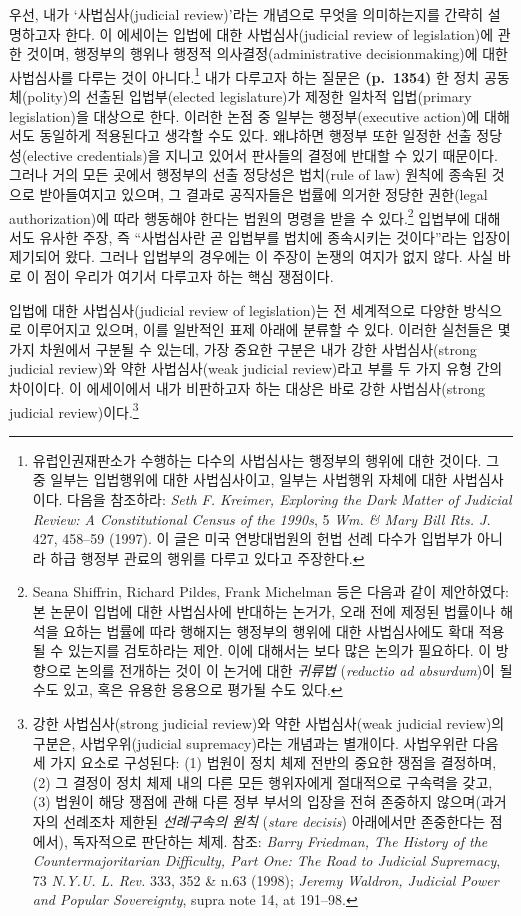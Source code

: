 \documentclass[a4paper,12pt,oneside]{article}  %
\newcommand{\emphksans}[1]{%
  {\kopubhangul\kopublatin\textsl{#1}}%
}
\begin{document}
우선, 내가 `사법심사(judicial review)'라는 개념으로 무엇을 의미하는지를
간략히 설명하고자 한다. 이 에세이는 입법에 대한 사법심사(judicial review
of legislation)에 관한 것이며, 행정부의 행위나 행정적
의사결정(administrative decisionmaking)에 대한 사법심사를 다루는 것이
아니다.\footnote{유럽인권재판소가 수행하는 다수의 사법심사는 행정부의
  행위에 대한 것이다. 그 중 일부는 입법행위에 대한 사법심사이고, 일부는
  사법행위 자체에 대한 사법심사이다. 다음을 참조하라: \emph{Seth F.
  Kreimer, Exploring the Dark Matter of Judicial Review: A
  Constitutional Census of the 1990s}, 5 \emph{Wm. \& Mary Bill Rts. J.}
  427, 458--59 (1997). 이 글은 미국 연방대법원의 헌법 선례 다수가
  입법부가 아니라 하급 행정부 관료의 행위를 다루고 있다고 주장한다.}
내가 다루고자 하는 질문은 \textbf{(p.~1354)} 한 정치 공동체(polity)의
선출된 입법부(elected legislature)가 제정한 일차적 입법(primary
legislation)을 대상으로 한다. 이러한 논점 중 일부는 행정부(executive
action)에 대해서도 동일하게 적용된다고 생각할 수도 있다. 왜냐하면 행정부
또한 일정한 선출 정당성(elective credentials)을 지니고 있어서 판사들의
결정에 반대할 수 있기 때문이다. 그러나 거의 모든 곳에서 행정부의 선출
정당성은 법치(rule of law) 원칙에 종속된 것으로 받아들여지고 있으며, 그
결과로 공직자들은 법률에 의거한 정당한 권한(legal authorization)에 따라
행동해야 한다는 법원의 명령을 받을 수 있다.\footnote{Seana Shiffrin,
  Richard Pildes, Frank Michelman 등은 다음과 같이 제안하였다: 본 논문이
  입법에 대한 사법심사에 반대하는 논거가, 오래 전에 제정된 법률이나
  해석을 요하는 법률에 따라 행해지는 행정부의 행위에 대한 사법심사에도
  확대 적용될 수 있는지를 검토하라는 제안. 이에 대해서는 보다 많은
  논의가 필요하다. 이 방향으로 논의를 전개하는 것이 이 논거에 대한
  \emphksans{귀류법}(\emph{reductio ad absurdum})이 될 수도 있고, 혹은 유용한
  응용으로 평가될 수도 있다.} 입법부에 대해서도 유사한 주장, 즉
``사법심사란 곧 입법부를 법치에 종속시키는 것이다''라는 입장이 제기되어
왔다. 그러나 입법부의 경우에는 이 주장이 논쟁의 여지가 없지 않다. 사실
바로 이 점이 우리가 여기서 다루고자 하는 핵심 쟁점이다.

입법에 대한 사법심사(judicial review of legislation)는 전 세계적으로
다양한 방식으로 이루어지고 있으며, 이를 일반적인 표제 아래에 분류할 수
있다. 이러한 실천들은 몇 가지 차원에서 구분될 수 있는데, 가장 중요한
구분은 내가 강한 사법심사(strong judicial review)와 약한 사법심사(weak
judicial review)라고 부를 두 가지 유형 간의 차이이다. 이 에세이에서 내가
비판하고자 하는 대상은 바로 강한 사법심사(strong judicial
review)이다.\footnote{강한 사법심사(strong judicial review)와 약한
  사법심사(weak judicial review)의 구분은, 사법우위(judicial
  supremacy)라는 개념과는 별개이다. 사법우위란 다음 세 가지 요소로
  구성된다: (1) 법원이 정치 체제 전반의 중요한 쟁점을 결정하며, (2) 그
  결정이 정치 체제 내의 다른 모든 행위자에게 절대적으로 구속력을 갖고,
  (3) 법원이 해당 쟁점에 관해 다른 정부 부서의 입장을 전혀 존중하지
  않으며(과거 자의 선례조차 제한된 \emphksans{선례구속의 원칙}(\emph{stare decisis})
  아래에서만 존중한다는 점에서), 독자적으로 판단하는 체제. 참조:
  \emph{Barry Friedman, The History of the Countermajoritarian
  Difficulty, Part One: The Road to Judicial Supremacy}, 73 \emph{N.Y.U.
  L. Rev.} 333, 352 \& n.63 (1998); \emph{Jeremy Waldron, Judicial Power
  and Popular Sovereignty}, supra note 14, at 191--98.}
\end{document}
